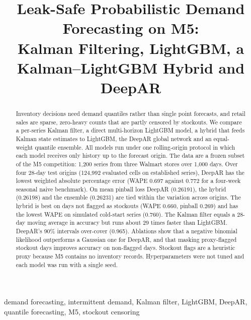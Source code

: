 \documentclass[conference]{IEEEtran}
\begin{document}
\title{Leak-Safe Probabilistic Demand Forecasting on M5:\\
Kalman Filtering, LightGBM, a Kalman--LightGBM Hybrid and DeepAR}

\author{
}

\maketitle

\begin{abstract}
Inventory decisions need demand quantiles rather than single point forecasts, and retail sales are sparse, zero-heavy counts that are partly censored by stockouts. We compare a per-series Kalman filter, a direct multi-horizon LightGBM model, a hybrid that feeds Kalman state estimates to LightGBM, the DeepAR global network and an equal-weight quantile ensemble. All models run under one rolling-origin protocol in which each model receives only history up to the forecast origin. The data are a frozen subset of the M5 competition: 1,200 series from three Walmart stores over 1,000 days. Over four 28-day test origins (124,992 evaluated cells on established series), DeepAR has the lowest weighted absolute percentage error (WAPE 0.697 against 0.772 for a four-week seasonal naive benchmark). On mean pinball loss DeepAR (0.26191), the hybrid (0.26198) and the ensemble (0.26231) are tied within the variation across origins. The hybrid is best on days not flagged as stockouts (WAPE 0.660, pinball 0.269) and has the lowest WAPE on simulated cold-start series (0.760). The Kalman filter equals a 28-day moving average in accuracy but runs about 29 times faster than LightGBM. DeepAR's 90\% intervals over-cover (0.965). Ablations show that a negative binomial likelihood outperforms a Gaussian one for DeepAR, and that masking proxy-flagged stockout days improves accuracy on non-flagged days. Stockout flags are a heuristic proxy because M5 contains no inventory records. Hyperparameters were not tuned and each model was run with a single seed.
\end{abstract}

\begin{IEEEkeywords}
demand forecasting, intermittent demand, Kalman filter, LightGBM, DeepAR, quantile forecasting, M5, stockout censoring
\end{IEEEkeywords}

\end{document}
